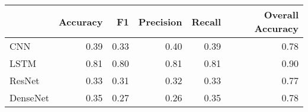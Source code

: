 \begin{tabular}{lrrrrr}
\toprule
{} &  Accuracy &    F1 &  Precision &  Recall &  Overall Accuracy \\
\midrule
CNN      &      0.39 &  0.33 &       0.40 &    0.39 &              0.78 \\
LSTM     &      0.81 &  0.80 &       0.81 &    0.81 &              0.90 \\
ResNet   &      0.33 &  0.31 &       0.32 &    0.33 &              0.77 \\
DenseNet &      0.35 &  0.27 &       0.26 &    0.35 &              0.78 \\
\bottomrule
\end{tabular}
